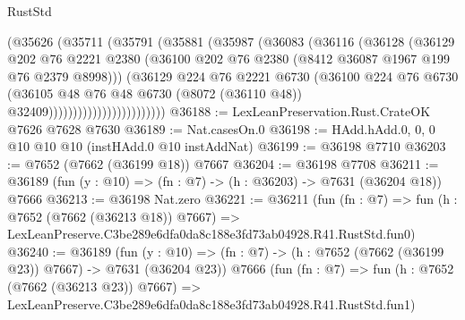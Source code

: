 \begin{lexlean}{RustStd}
\begin{coremodule}
                              (@35626
                                (@35711
                                  (@35791
                                    (@35881
                                      (@35987
                                        (@36083
                                          (@36116
                                            (@36128
                                              (@36129
                                                @202
                                                @76
                                                @2221
                                                @2380
                                                (@36100
                                                  @202
                                                  @76
                                                  @2380
                                                  (@8412 @36087 @1967 @199 @76 @2379 @8998)))
                                              (@36129
                                                @224
                                                @76
                                                @2221
                                                @6730
                                                (@36100
                                                  @224
                                                  @76
                                                  @6730
                                                  (@36105
                                                    @48
                                                    @76
                                                    @48
                                                    @6730
                                                    (@8072 (@36110 @48))
                                                    @32409))))))))))))))))))))))))
@36188 := LexLeanPreservation.Rust.CrateOK @7626 @7628 @7630
@36189 := Nat.casesOn.{0}
@36198 := HAdd.hAdd.{0, 0, 0} @10 @10 @10 (instHAdd.{0} @10 instAddNat)
@36199 := @36198 @7710
@36203 := @7652 (@7662 (@36199 @18)) @7667
@36204 := @36198 @7708
@36211 := @36189 (fun (y : @10) => (fn : @7) -> (h : @36203) -> @7631 (@36204 @18)) @7666
@36213 := @36198 Nat.zero
@36221 := @36211
    (fun (fn : @7) =>
    fun (h : @7652 (@7662 (@36213 @18)) @7667) =>
    LexLeanPreserve.C3be289e6dfa0da8c188e3fd73ab04928.R41.RustStd.fun0)
@36240 := @36189
    (fun (y : @10) => (fn : @7) -> (h : @7652 (@7662 (@36199 @23)) @7667) -> @7631 (@36204 @23))
    @7666
    (fun (fn : @7) =>
    fun (h : @7652 (@7662 (@36213 @23)) @7667) =>
    LexLeanPreserve.C3be289e6dfa0da8c188e3fd73ab04928.R41.RustStd.fun1)

\end{coremodule}
\end{lexlean}
